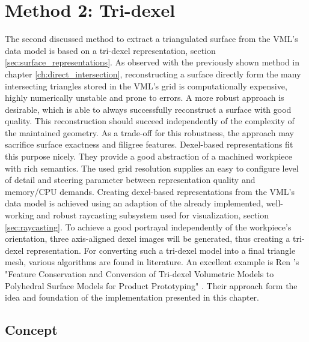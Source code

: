 
\chapter{Method 2: Tri-dexel}
\label{ch:tri_dexel}

The second discussed method to extract a triangulated surface from the VML's data model is based on a tri-dexel representation, \cf section \ref{sec:surface_representations}.
As observed with the previously shown method in chapter \ref{ch:direct_intersection}, reconstructing a surface directly form the many intersecting triangles stored in the VML's grid is computationally expensive, highly numerically unstable and prone to errors.
A more robust approach is desirable, which is able to always successfully reconstruct a surface with good quality.
This reconstruction should succeed independently of the complexity of the maintained geometry.
As a trade-off for this robustness, the approach may sacrifice surface exactness and filigree features.
Dexel-based representations fit this purpose nicely.
They provide a good abstraction of a machined workpiece with rich semantics.
The used grid resolution supplies an easy to configure level of detail and steering parameter between representation quality and memory/CPU demands.
Creating dexel-based representations from the VML's data model is achieved using an adaption of the already implemented, well-working and robust raycasting subsystem used for visualization, \cf section \ref{sec:raycasting}.
To achieve a good portrayal independently of the workpiece's orientation, three axis-aligned dexel images will be generated, thus creating a tri-dexel representation.
For converting such a tri-dexel model into a final triangle mesh, various algorithms are found in literature.
An excellent example is Ren \etal's "Feature Conservation and Conversion of Tri-dexel Volumetric Models to Polyhedral Surface Models for Product Prototyping" \cite{tridexel_reconstruction}.
Their approach form the idea and foundation of the implementation presented in this chapter.


\section{Concept}
\label{sec:tri_dexel_concept}

